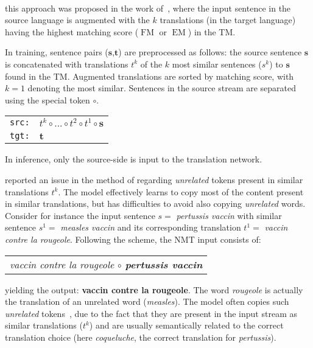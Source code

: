 \paragraph{} this approach was proposed in the work of~\citet{bulte19neural},
where the input sentence in the source language is augmented with the $k$ translations (in the target language) having the highest matching score ($\operatorname{FM}$ or $\operatorname{EM}$) in the TM. 

In training, sentence pairs ($\textbf{s}$,$\textbf{t}$) are preprocessed as follows: the source sentence $\textbf{s}$ is concatenated with translations $t^k$ of the $k$ most similar sentences ($s^k$) to $\textbf{s}$ found in the TM. Augmented translations are sorted by matching score, with $k=1$ denoting the most similar. Sentences in the source stream are separated using the special token $\circ$.

\begin{center}
\begin{tabular}{ll}
\texttt{src:} & $t^{k} \circ ... \circ t^{2} \circ t^{1} \circ \textbf{s}$ \\
\texttt{tgt:} & $\textbf{t}$%
\end{tabular}
\end{center}
\noindent In inference, only the source-side is input to the translation network.

\citet{xu20boosting} reported an issue in the method of \citet{bulte19neural} regarding {\em unrelated} tokens present in similar translations $t^k$. The model effectively learns to copy most of the content present in similar translations, but has difficulties to avoid also copying {\em unrelated} words. Consider for instance the input sentence $s=$ {\it pertussis vaccin} with similar sentence $s^1=$ {\it measles vaccin} and its corresponding translation $t^1=$ {\it vaccin contre la rougeole}. Following the  scheme, the NMT input consists of:
\begin{center}
\begin{tabular}{c}
\it vaccin contre la rougeole $\circ$ {\bf pertussis vaccin} \\
\end{tabular}
\end{center}
\noindent yielding the output: {\bf vaccin contre la rougeole}.
%
The word {\it rougeole} is actually the translation of an unrelated word ({\it measles}). The model often copies such {\em unrelated} tokens~\citep{xu20boosting}, due to the fact that they are present in the input stream as similar translations ($t^k$) and are usually semantically related to the correct translation choice (here {\it coqueluche}, the correct translation for {\it pertussis}).

